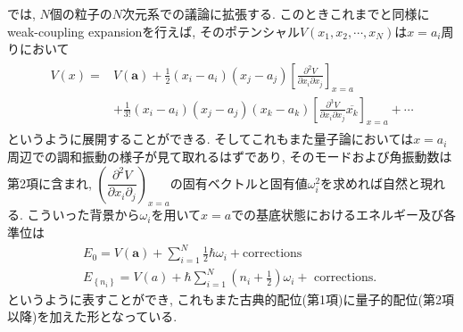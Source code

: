 \documentclass[dvipdfmx,11pt,a4paper,oneside,openany]{jsbook}
\begin{document}
では, $N$個の粒子の$N$次元系での議論に拡張する. このときこれまでと同様にweak-coupling expansionを行えば, そのポテンシャル$V(x_1,x_2,\cdots,x_N)$は$x=a_i$周りにおいて
\begin{align}
    \begin{aligned}
        V(x)= & V(\bm{a})+\frac{1}{2}\left(x_{i}-a_{i}\right)\left(x_{j}-a_{j}\right)\left[\frac{\partial^{2} V}{\partial x_{i} \partial x_{j}}\right]_{x=a}                                          \\
              & +\frac{1}{3 !}\left(x_{i}-a_{i}\right)\left(x_{j}-a_{j}\right)\left(x_{k}-a_{k}\right)\left[\frac{\partial^{3} V}{\partial x_{i} \partial x_{j}} \overline{x_{k}}\right]_{x=a}+\cdots
    \end{aligned}
\end{align}
というように展開することができる. そしてこれもまた量子論においては$x=a_i$周辺での調和振動の様子が見て取れるはずであり, そのモードおよび角振動数は第2項に含まれ, $\left(\dfrac{\partial^2 V}{\partial x_i\partial_j}\right)_{x=a}$の固有ベクトルと固有値$\omega_i^2$を求めれば自然と現れる. こういった背景から$\omega_i$を用いて$x=a$での基底状態におけるエネルギー及び各準位は
\begin{align}
    E_0=V(\bm{a})+\sum_{i=1}^{N}\frac{1}{2}\hbar\omega_i+\text{corrections} \\
    E_{\left\{n_{i}\right\}}=V(a)+\hbar \sum_{i=1}^{N}\left(n_{i}+\frac{1}{2}\right) \omega_{i}+\text { corrections. }
\end{align}
というように表すことができ, これもまた古典的配位(第1項)に量子的配位(第2項以降)を加えた形となっている.
\end{document}
